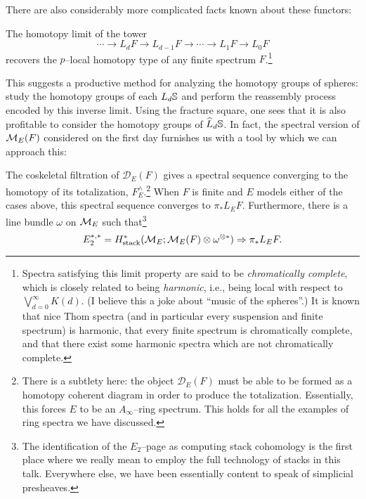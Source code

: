 There are also considerably more complicated facts known about these functors:
\begin{theorem}
The homotopy limit of the tower \[\cdots \to L_d F \to L_{d-1} F \to \cdots \to L_1 F \to L_0 F\] recovers the $p$--local homotopy type of any finite spectrum $F$.\footnote{Spectra satisfying this limit property are said to be \textit{chromatically complete}, which is closely related to being \textit{harmonic}, i.e., being local with respect to $\bigvee_{d=0}^\infty K(d)$.  (I believe this a joke about ``music of the spheres''.)  It is known that nice Thom spectra (and in particular every suspension and finite spectrum) is harmonic, that every finite spectrum is chromatically complete, and that there exist some harmonic spectra which are not chromatically complete.}
\end{theorem}

\noindent This suggests a productive method for analyzing the homotopy groups of spheres: study the homotopy groups of each $L_d \S$ and perform the reassembly process encoded by this inverse limit.  Using the fracture square, one sees that it is also profitable to consider the homotopy groups of $\widehat L_d \S$.  In fact, the spectral version of $\M_E(F)$ considered on the first day furnishes us with a tool by which we can approach this:

\begin{theorem}[Bousfield, et al.]
The coskeletal filtration of $\mathcal D_E(F)$ gives a spectral sequence converging to the homotopy of its totalization, $F^\wedge_E$.\footnote{There is a subtlety here: the object $\mathcal D_E(F)$ must be able to be formed as a homotopy coherent diagram in order to produce the totalization. Essentially, this forces $E$ to be an $A_\infty$--ring spectrum. This holds for all the examples of ring spectra we have discussed.}  When $F$ is finite and $E$ models either of the cases above, this spectral sequence converges to $\pi_* L_E F$.  Furthermore, there is a line bundle $\omega$ on $\M_E$ such that\footnote{The identification of the $E_2$--page as computing stack cohomology is the first place where we really mean to employ the full technology of stacks in this talk.  Everywhere else, we have been essentially content to speak of simplicial presheaves.} \[E_2^{*, *} = H^*_{\mathrm{stack}}(\M_E; \M_E(F) \otimes \omega^{\otimes *}) \Rightarrow \pi_* L_E F.\]
\end{theorem}

